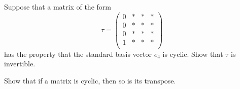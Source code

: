\documentclass[reqno]{amsart} 
\begin{document}
\begin{exercise}\label{exercise:d1aa77216096}
  Suppose that a matrix of the form
  \begin{equation*}
    \tau =
    \begin{pmatrix}
      0 & \ast & \ast & \ast \\
      0 & \ast & \ast & \ast \\
      0 & \ast & \ast & \ast \\
      1 & \ast & \ast & \ast \\
    \end{pmatrix}
  \end{equation*}
  has the property that the standard basis vector $e_4$ is cyclic.  Show that $\tau$ is invertible.
\end{exercise}

\begin{exercise}\label{exercise:d1aa77219196}
  Show that if a matrix is cyclic, then so is its transpose.
\end{exercise}



{} 
\end{document}
